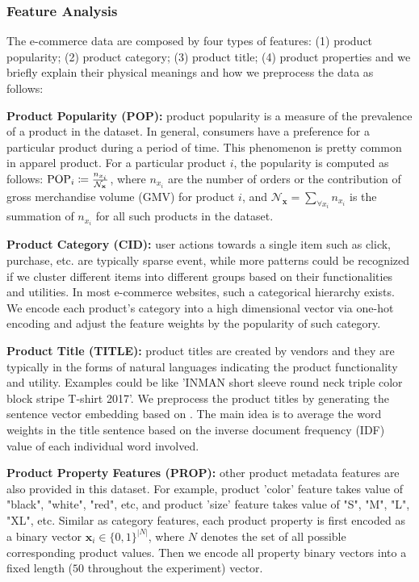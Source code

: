 \subsubsection{Feature Analysis}
The e-commerce data are composed by four types of features: (1) product popularity; (2) product category; (3) product title; (4) product properties and we briefly explain their physical meanings and how we preprocess the data as follows:

\textbf{Product Popularity (POP):} product popularity is a measure of the prevalence of a product in the dataset. In general, consumers have a preference for a particular product during a period of time. This phenomenon is pretty common in apparel product. For a particular product $i$, the popularity is computed as follows: $\mathrm{\scriptsize POP}_{i} \coloneqq \frac{n_{x_i}}{\mathcal{N}_\mathbf{x}}$, where $n_{x_i}$ are the number of orders or the contribution of gross merchandise volume (GMV) for product $i$,  and $\mathcal{N}_\mathbf{x} = \sum_{\forall x_i}n_{x_i}$ is the summation of $n_{x_i}$ for all such products in the dataset.

\textbf{Product Category (CID):}  user actions towards a single item such as click, purchase, etc. are typically sparse event, while more patterns could be recognized if we cluster different items into different groups based on their functionalities and utilities.  In most e-commerce websites, such a categorical hierarchy exists.    We encode each product's category into a high dimensional vector via one-hot encoding and adjust the feature weights by the popularity of such category.

\textbf{Product Title (TITLE):} product titles are created by vendors and they are typically in the forms of natural languages indicating the product functionality and utility.  Examples could be like 'INMAN short sleeve round neck triple color block stripe T-shirt 2017'.  We preprocess the product titles by generating the sentence vector embedding based on \cite{de2016representation}.  The main idea is to average the word weights in the title sentence based on the inverse document frequency (IDF) value of each individual word involved.

\textbf{Product Property Features (PROP):} other product metadata features are also provided in this dataset. For example,  product 'color' feature takes value of "black", "white", "red", etc, and product 'size' feature takes value of "S", "M", "L", "XL", etc.  Similar as category features, each product property is first encoded as a binary vector $\bm{x}_i \in \{0, 1\}^{|N|}$, where $N$ denotes the set of all possible corresponding product values.  Then we encode all property binary vectors into a fixed length ($50$ throughout the experiment) vector. %

